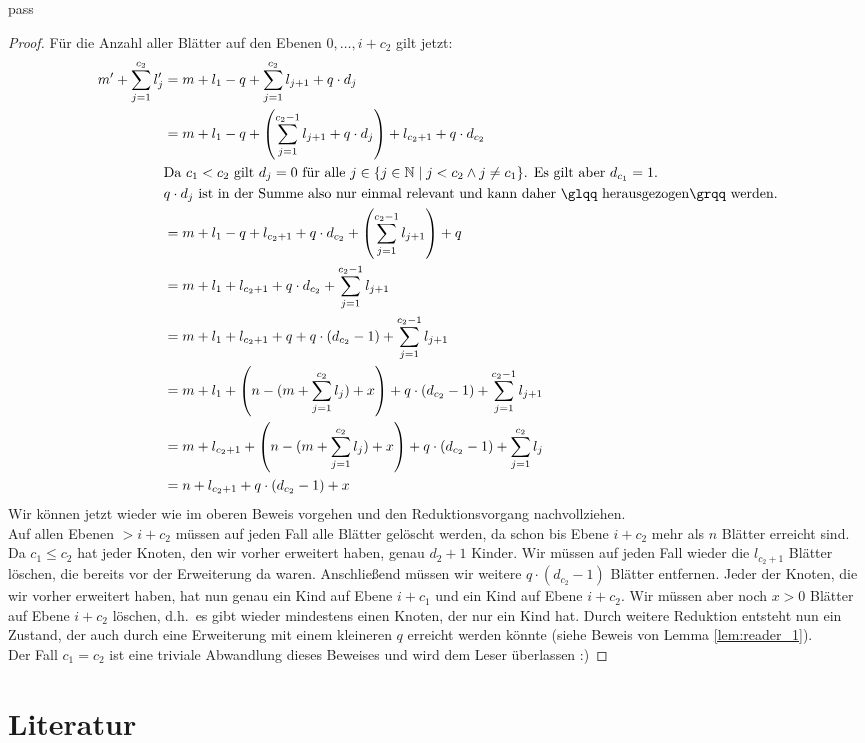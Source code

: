 pass\documentclass[a4paper,10pt,ngerman]{scrartcl}
\begin{document}
\begin{proof}
        Für die Anzahl aller Blätter auf den Ebenen $0, \dots, i + c_2$ gilt jetzt:
        \begin{equation}
            \begin{aligned}
                m' + \sum^{c_2}_{j=1} l_j' &= m + l_1 - q + \sum^{c_2}_{j=1} l_{j+1} + q \cdot d_j\\
                &= m + l_1 - q + \left(\sum^{c_2-1}_{j=1} l_{j+1} + q \cdot d_j\right) + l_{c_2 + 1} + q \cdot d_{c_2}\\
                &\text{Da $c_1 < c_2$ gilt $d_j = 0$ für alle $j \in \{j \in \mathbb N \mid j < c_2 \land j \neq c_1\}$. Es gilt aber $d_{c_1} = 1$.} \\
                &\text{$q \cdot d_j$ ist in der Summe also nur einmal relevant und kann daher \glqq herausgezogen\grqq~werden.} \\
                &= m + l_1 - q + l_{c_2 + 1} + q \cdot d_{c_2} + \left(\sum^{c_2-1}_{j=1} l_{j+1}\right) + q\\
                &= m + l_1 + l_{c_2 + 1} + q \cdot d_{c_2} + \sum^{c_2-1}_{j=1} l_{j+1}\\
                &=m + l_1 + l_{c_2 + 1} + q + q \cdot (d_{c_2} - 1)  + \sum^{c_2-1}_{j=1} l_{j+1} \\
                &= m + l_1 +  \left(n - (m + \sum^{c_2}_{j=1} l_j) + x\right) + q \cdot (d_{c_2} - 1) + \sum^{c_2-1}_{j=1} l_{j+1} \\
                &= m + l_{c_2 + 1} +  \left(n - (m + \sum^{c_2}_{j=1} l_j) + x\right) + q \cdot (d_{c_2} - 1) + \sum^{c_2}_{j=1} l_{j} \\
                &= n + l_{c_2 + 1} + q \cdot (d_{c_2} - 1) + x\\
            \end{aligned}\label{eq:equation2}
        \end{equation}
        Wir können jetzt wieder wie im oberen Beweis vorgehen und den Reduktionsvorgang nachvollziehen. \\
        Auf allen Ebenen $> i + c_2$ müssen auf jeden Fall alle Blätter gelöscht werden, da schon bis Ebene $i + c_2$ mehr als $n$ Blätter erreicht sind.
        Da $c_1 \le c_2$ hat jeder Knoten, den wir vorher erweitert haben, genau $d_2 + 1$ Kinder.
        Wir müssen auf jeden Fall wieder die $l_{c_2 + 1}$ Blätter löschen, die bereits vor der Erweiterung da waren.
        Anschließend müssen wir weitere $q \cdot (d_{c_2} - 1)$ Blätter entfernen.
        Jeder der Knoten, die wir vorher erweitert haben, hat nun genau ein Kind auf Ebene $i + c_1$ und ein Kind auf Ebene $i + c_2$.
        Wir müssen aber noch $x > 0$ Blätter auf Ebene $i + c_2$ löschen, d.h.\ es gibt wieder mindestens einen Knoten, der nur ein Kind hat.
        Durch weitere Reduktion entsteht nun ein Zustand, der auch durch eine Erweiterung mit einem kleineren $q$ erreicht werden könnte (siehe Beweis von Lemma \ref{lem:reader_1}). \\
        Der Fall $c_1 = c_2$ ist eine triviale Abwandlung dieses Beweises und wird dem Leser überlassen :)
    \end{proof}


    \section{Literatur}
    \printbibliography[heading=none]
\end{document}
